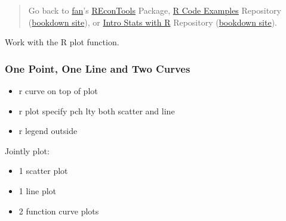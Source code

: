 \documentclass[
]{book}
\providecommand{\tightlist}{%
  \setlength{\itemsep}{0pt}\setlength{\parskip}{0pt}}
\begin{document}
\begin{quote}
Go back to \href{http://fanwangecon.github.io/}{fan}'s \href{https://fanwangecon.github.io/REconTools/}{REconTools} Package, \href{https://fanwangecon.github.io/R4Econ/}{R Code Examples} Repository (\href{https://fanwangecon.github.io/R4Econ/bookdown}{bookdown site}), or \href{https://fanwangecon.github.io/Stat4Econ/}{Intro Stats with R} Repository (\href{https://fanwangecon.github.io/Stat4Econ/bookdown}{bookdown site}).
\end{quote}

Work with the R plot function.

\hypertarget{one-point-one-line-and-two-curves}{%
\subsubsection{One Point, One Line and Two Curves}\label{one-point-one-line-and-two-curves}}

\begin{itemize}
\tightlist
\item
  r curve on top of plot
\item
  r plot specify pch lty both scatter and line
\item
  r legend outside
\end{itemize}

Jointly plot:

\begin{itemize}
\tightlist
\item
  1 scatter plot
\item
  1 line plot
\item
  2 function curve plots
\end{itemize}
\end{document}
